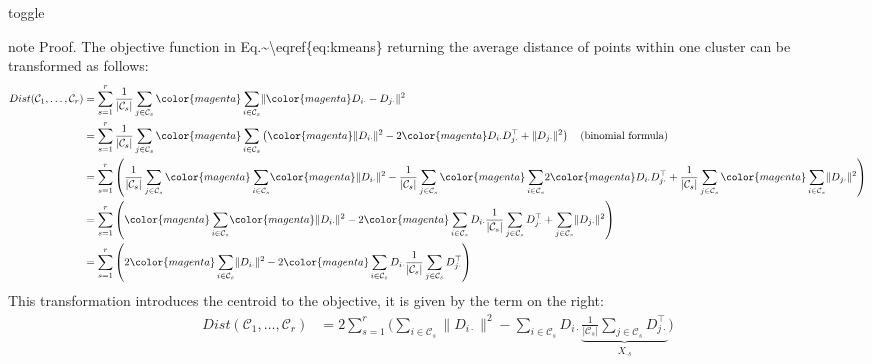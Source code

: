 \documentclass[letterpaper,10pt,english]{jupyterBook}
\begin{document}
\begin{sphinxuseclass}{toggle}
\begin{sphinxadmonition}{note}
\sphinxAtStartPar
Proof. The objective function in Eq.\textasciitilde{}\textbackslash{}eqref\{eq:k\sphinxhyphen{}means\} returning the average distance of points within one cluster can be transformed as follows:
\label{equation:clustering_k_means:b205a837-a196-4bb9-b275-05182d741725}\begin{align}
    Dist(\mathcal{C}_1,\ldots,\mathcal{C}_r)
&=\sum_{s=1}^r\frac{1}{|\mathcal{C}_s|}\sum_{j\in\mathcal{C}_s}{\color{magenta}\sum_{i\in\mathcal{C}_s}}\lVert {\color{magenta}D_{i\cdot}}-D_{j\cdot}\rVert^2\\ 
    &= \sum_{s=1}^r\frac{1}{|\mathcal{C}_s|}\sum_{j\in\mathcal{C}_s}{\color{magenta}\sum_{i\in\mathcal{C}_s}}\left(
    {\color{magenta}\lVert D_{i\cdot}\rVert^2} - 2{\color{magenta}D_{i\cdot}}D_{j\cdot}^\top +
    \lVert D_{j\cdot} \rVert^2\right)\quad\text{(binomial formula)}\\
    &= \sum_{s=1}^r\left(\frac{1}{|\mathcal{C}_s|}\sum_{j\in\mathcal{C}_s}{\color{magenta}\sum_{i\in\mathcal{C}_s}}
    {\color{magenta}\lVert D_{i\cdot}\rVert^2}
    - \frac{1}{|\mathcal{C}_s|}\sum_{j\in\mathcal{C}_s}{\color{magenta}\sum_{i\in\mathcal{C}_s}}2{\color{magenta}D_{i\cdot}}D_{j\cdot}^\top +
    \frac{1}{|\mathcal{C}_s|}\sum_{j\in\mathcal{C}_s}{\color{magenta}\sum_{i\in\mathcal{C}_s}}\lVert D_{j\cdot} \rVert^2\right)\\
    &= \sum_{s=1}^r\left({\color{magenta}\sum_{i\in\mathcal{C}_s}}
    {\color{magenta}\lVert D_{i\cdot}\rVert^2}
    -2{\color{magenta}\sum_{i\in\mathcal{C}_s} D_{i\cdot}} \frac{1}{|\mathcal{C}_s|}\sum_{j\in\mathcal{C}_s}D_{j\cdot}^\top +
    \sum_{j\in\mathcal{C}_s}\lVert D_{j\cdot} \rVert^2\right)\\
    &=\sum_{s=1}^r\left(2{\color{magenta}\sum_{i\in\mathcal{C}_s}\lVert D_{i\cdot}\rVert^2}-2{\color{magenta}\sum_{i\in\mathcal{C}_s} D_{i\cdot}} \frac{1}{|\mathcal{C}_s|}\sum_{j\in\mathcal{C}_s}D_{j\cdot}^\top\right) 
\end{align}
\sphinxAtStartPar
This transformation introduces the centroid to the objective, it is given by the term on the right:
\label{equation:clustering_k_means:f792507f-3981-4ccc-9d66-42561f4046ea}\begin{align}
    Dist(\mathcal{C}_1,\ldots,\mathcal{C}_r)
    &=2\sum_{s=1}^r\Biggl(\sum_{i\in\mathcal{C}_s}\lVert D_{i\cdot}\rVert^2-\sum_{i\in\mathcal{C}_s} D_{i\cdot} \underbrace{\frac{1}{|\mathcal{C}_s|}\sum_{j\in\mathcal{C}_s}D_{j\cdot}^\top}_{X_{\cdot s}}\Biggr)

\end{align}
\end{sphinxadmonition}
\end{sphinxuseclass}
\end{document}
